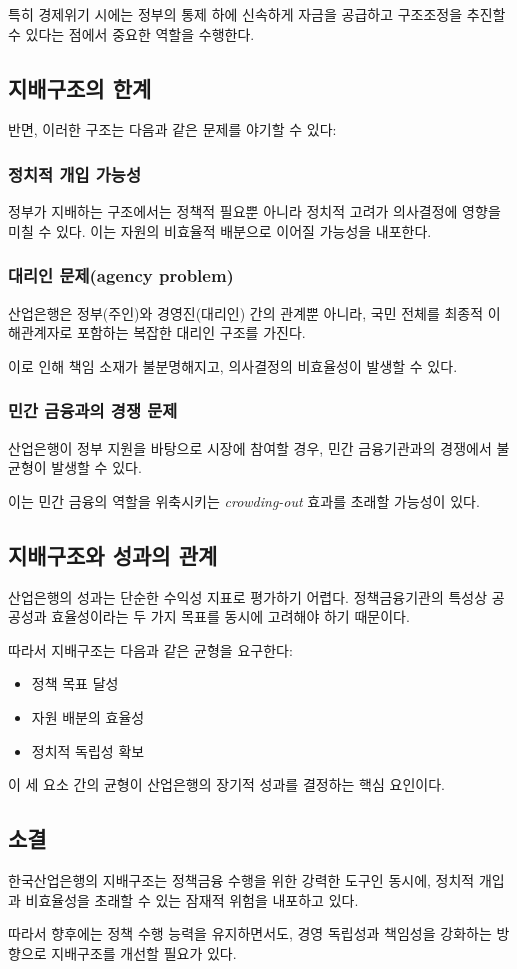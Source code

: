 특히 경제위기 시에는 정부의 통제 하에 신속하게 자금을 공급하고 구조조정을 추진할 수 있다는 점에서 중요한 역할을 수행한다.

\subsection{지배구조의 한계}

반면, 이러한 구조는 다음과 같은 문제를 야기할 수 있다:

\subsubsection{정치적 개입 가능성}

정부가 지배하는 구조에서는 정책적 필요뿐 아니라 정치적 고려가 의사결정에 영향을 미칠 수 있다.  
이는 자원의 비효율적 배분으로 이어질 가능성을 내포한다.

\subsubsection{대리인 문제(agency problem)}

산업은행은 정부(주인)와 경영진(대리인) 간의 관계뿐 아니라, 국민 전체를 최종적 이해관계자로 포함하는 복잡한 대리인 구조를 가진다.

이로 인해 책임 소재가 불분명해지고, 의사결정의 비효율성이 발생할 수 있다.

\subsubsection{민간 금융과의 경쟁 문제}

산업은행이 정부 지원을 바탕으로 시장에 참여할 경우, 민간 금융기관과의 경쟁에서 불균형이 발생할 수 있다.

이는 민간 금융의 역할을 위축시키는 \textit{crowding-out} 효과를 초래할 가능성이 있다.

\subsection{지배구조와 성과의 관계}

산업은행의 성과는 단순한 수익성 지표로 평가하기 어렵다.  
정책금융기관의 특성상 공공성과 효율성이라는 두 가지 목표를 동시에 고려해야 하기 때문이다.

따라서 지배구조는 다음과 같은 균형을 요구한다:

\begin{itemize}
    \item 정책 목표 달성
    \item 자원 배분의 효율성
    \item 정치적 독립성 확보
\end{itemize}

이 세 요소 간의 균형이 산업은행의 장기적 성과를 결정하는 핵심 요인이다.

\subsection{소결}

한국산업은행의 지배구조는 정책금융 수행을 위한 강력한 도구인 동시에, 정치적 개입과 비효율성을 초래할 수 있는 잠재적 위험을 내포하고 있다.

따라서 향후에는 정책 수행 능력을 유지하면서도, 경영 독립성과 책임성을 강화하는 방향으로 지배구조를 개선할 필요가 있다.